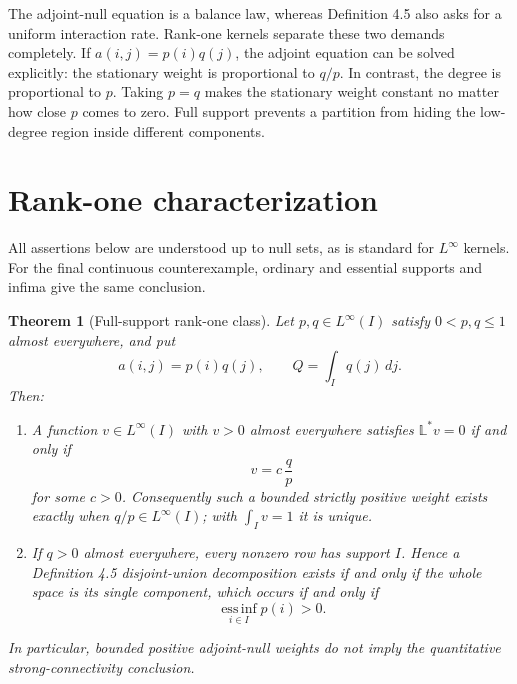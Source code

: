 \documentclass[11pt]{article}
\newtheorem{theorem}{Theorem}
\newcommand{\essinf}{\operatorname*{ess\,inf}}
\newcommand{\Lop}{\mathbb L}
\begin{document}
The adjoint-null equation is a balance law, whereas Definition 4.5 also asks
for a uniform interaction rate.  Rank-one kernels separate these two demands
completely.  If $a(i,j)=p(i)q(j)$, the adjoint equation can be solved explicitly:
the stationary weight is proportional to $q/p$.  In contrast, the degree is
proportional to $p$.  Taking $p=q$ makes the stationary weight constant no
matter how close $p$ comes to zero.  Full support prevents a partition from
hiding the low-degree region inside different components.

\section{Rank-one characterization}

All assertions below are understood up to null sets, as is standard for
$L^\infty$ kernels.  For the final continuous counterexample, ordinary and
essential supports and infima give the same conclusion.

\begin{theorem}[Full-support rank-one class]\label{thm:rankone}
Let $p,q\in L^\infty(I)$ satisfy $0<p,q\leq1$ almost everywhere, and put
\[
 a(i,j)=p(i)q(j),\qquad Q=\int_I q(j)\,dj.
\]
Then:
\begin{enumerate}
\item A function $v\in L^\infty(I)$ with $v>0$ almost everywhere satisfies
      $\Lop^*v=0$ if and only if
      \[
      v=c\,\frac{q}{p}
      \]
      for some $c>0$. Consequently such a bounded strictly positive weight
      exists exactly when $q/p\in L^\infty(I)$; with $\int_Iv=1$ it is unique.
\item If $q>0$ almost everywhere, every nonzero row has support $I$. Hence a
      Definition 4.5 disjoint-union decomposition exists if and only if the
      whole space is its single component, which occurs if and only if
      \[
      \essinf_{i\in I}p(i)>0.
      \]
\end{enumerate}
In particular, bounded positive adjoint-null weights do not imply the
quantitative strong-connectivity conclusion.
\end{theorem}
\end{document}
